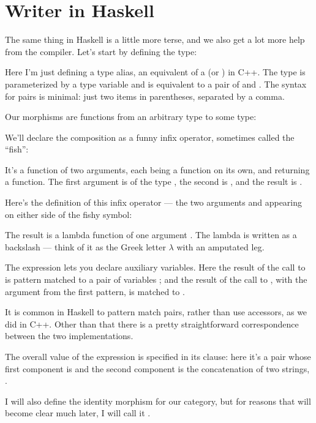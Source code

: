 \section{Writer in Haskell}

The same thing in Haskell is a little more terse, and we also get a lot
more help from the compiler. Let's start by defining the 
type:

Here I'm just defining a type alias, an equivalent of a 
(or ) in C++. The type  is parameterized by
a type variable  and is equivalent to a pair of  and
. The syntax for pairs is minimal: just two items in
parentheses, separated by a comma.

Our morphisms are functions from an arbitrary type to some
 type:

We'll declare the composition as a funny infix operator, sometimes
called the ``fish'':

It's a function of two arguments, each being a function on its own, and
returning a function. The first argument is of the type
, the second is
, and the result is
.

Here's the definition of this infix operator --- the two arguments
 and  appearing on either side of the fishy
symbol:

The result is a lambda function of one argument . The lambda
is written as a backslash --- think of it as the Greek letter $\lambda$ with an
amputated leg.

The  expression lets you declare auxiliary variables. Here
the result of the call to  is pattern matched to a pair of
variables ; and the result of the call to ,
with the argument  from the first pattern, is matched to
.

It is common in Haskell to pattern match pairs, rather than use
accessors, as we did in C++. Other than that there is a pretty
straightforward correspondence between the two implementations.

The overall value of the  expression is specified in its
 clause: here it's a pair whose first component is 
and the second component is the concatenation of two strings,
.

I will also define the identity morphism for our category, but for
reasons that will become clear much later, I will call it
.

